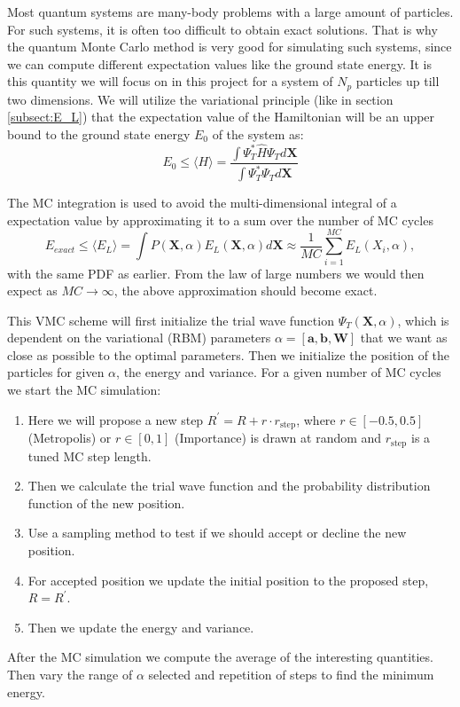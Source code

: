 \documentclass[12pt,a4paper,english]{article}
\begin{document}
Most quantum systems are many-body problems with a large amount of particles. For such systems, it is often too difficult to obtain exact solutions. That is why the quantum Monte Carlo method is very good for simulating such systems, since we can compute different expectation values like the ground state energy. It is this quantity we will focus on in this project for a system of $N_p$ particles up till two dimensions. We will utilize the variational principle (like in section \ref{subsect:E_L}) that the expectation value of the Hamiltonian will be an upper bound to the ground state energy $E_0$ of the system as:
\begin{equation}
\label{eq:variational_prin}
E_0\leq \langle H\rangle=\frac{\int\Psi_T^*\hat{H}\Psi_Td\textbf{X}}{\int\Psi_T^*\Psi_T d\textbf{X}}
\end{equation}

The MC integration is used to avoid the multi-dimensional integral of a expectation value by approximating it to a sum over the number of MC cycles
\begin{equation*}
E_{exact}\leq\langle E_L \rangle=\int P(\textbf{X}, \alpha)E_L(\textbf{X}, \alpha)d\textbf{X}\approx \frac{1}{MC}\sum_{i=1}^{MC}E_L(X_i, \alpha),
\end{equation*}
with the same PDF as earlier. From the law of large numbers we would then expect as $MC\rightarrow\infty$, the above approximation should become exact. 

This VMC scheme will first initialize the trial wave function $\Psi_T(\textbf{X},\alpha)$, which is dependent on the variational (RBM) parameters $\alpha=[\textbf{a},\textbf{b},\textbf{W}]$ that we want as close as possible to the optimal parameters. Then we initialize the position of the particles for given $\alpha$, the energy and variance. For a given number of MC cycles we start the MC simulation:
\begin{enumerate}
	\item Here we will propose a new step $R^{\prime}=R+r\cdot r_{\text{step}}$, where $r\in[-0.5,0.5]$ (Metropolis) or $r\in[0,1]$ (Importance) is drawn at random and $r_{\text{step}}$ is a tuned MC step length. 
	\item Then we calculate the trial wave function and the probability distribution function of the new position.
	\item Use a sampling method to test if we should accept or decline the new position.
	\item For accepted position we update the initial position to the proposed step, $R=R^{\prime}$.
	\item Then we update the energy and variance.
\end{enumerate} 
After the MC simulation we compute the average of the interesting quantities. Then vary the range of $\alpha$ selected and repetition of steps to find the minimum energy.
\end{document}
